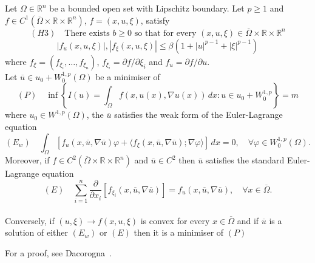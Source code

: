 \begin{theorem}
\label{thm:Direct_E_L}
    Let $\Omega \in \mathbb{R}^n$ be a bounded open set with Lipschitz boundary. Let $p\ge1$ and $f\in C^1(\overline{\Omega} \times \mathbb{R} \times \mathbb{R}^n)$, $f =(x,u,\xi)$, satisfy
$$
(H3) \quad \text{There exists } b \ge 0 \text{ so that for every }(x,u,\xi) \in \overline{\Omega} \times \mathbb{R} \times \mathbb{R}^n
$$
$$
|f_u(x,u,\xi)|, |f_\xi(x,u,\xi)| \le \beta(1+|u|^{p-1}+|\xi|^{p-1})
$$
where $f_\xi = (f_{\xi_i},\dots,f_{\xi_n})$, $f_{\xi_i} = \partial f / \partial \xi_i$ and $f_u = \partial f / \partial u$.
\\
Let $\overline{u} \in u_0 + W_0^{1,p}(\Omega)$ be a minimiser of
$$
(P) \quad \inf \left\{ I(u) = \int_\Omega f(x,u(x), \nabla u(x)) \, dx : u \in u_0 + W_0^{1,p} \right\} = m
$$
where $u_0 \in W^{1,p}(\Omega)$, the $\overline{u}$ satisfies the weak form of the Euler-Lagrange equation
$$
(E_w) \quad \int_\Omega [f_u(x,\overline{u},\nabla\overline{u})\varphi + \langle f_\xi(x,\overline{u},\nabla\overline{u});\nabla\varphi\rangle] \, dx = 0, \quad \forall \varphi \in W_0^{1,p}(\Omega).
$$
Moreover, if $f\in C^2(\overline{\Omega} \times \mathbb{R} \times \mathbb{R}^n)$ and $\overline{u} \in C^2$ then $\overline{u}$ satisfies the standard Euler-Lagrange equation
$$
(E) \quad \sum_{i =1}^n \frac{\partial}{\partial x_i} [f_{\xi_i}(x,\overline{u},\nabla\overline{u})] = f_u(x,\overline{u},\nabla\overline{u}), \quad \forall x \in \overline{\Omega}.
$$
\\
Conversely, if $(u,\xi) \rightarrow f(x,u,\xi)$ is convex for every $x \in \overline{\Omega}$ and if $\overline{u}$ is a solution of either $(E_w)$ or $(E)$  then it is a minimiser of $(P)$
\end{theorem}

For a proof, see Dacorogna~\cite[p.~113]{dacorogna}.